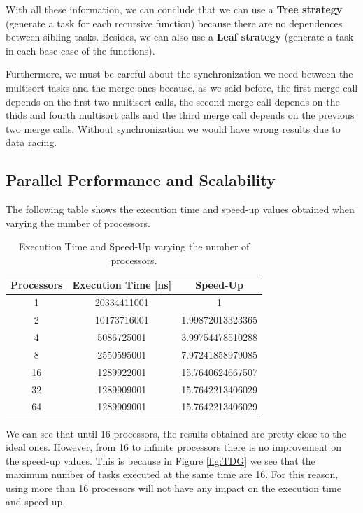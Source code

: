 \documentclass[12pt, a4paper]{article}
\begin{document}
With all these information, we can conclude that we can use a \textbf{Tree strategy} (generate a task for each recursive function) because there are no dependences between sibling tasks. Besides, we can also use a \textbf{Leaf strategy} (generate a task in each base case of the functions).

Furthermore, we must be careful about the synchronization we need between the multisort tasks and the merge ones because, as we said before, the first merge call depends on the first two multisort calls, the second merge call depends on the thids and fourth multisort calls and the third merge call depends on the previous two merge calls. Without synchronization we would have wrong results due to data racing.

\subsection{Parallel Performance and Scalability}

The following table shows the execution time and speed-up values obtained when varying the number of processors.

\begin{table}[H]
\centering
\begin{tabular}{ |c|c|c| } 
 \hline
 \textbf{Processors} & \textbf{Execution Time [ns]} & \textbf{Speed-Up} \\ 
 \hline
 \hline
	1	& 20334411001	& 1 \\
	 \hline
	2	& 10173716001	& 1.99872013323365 \\
	 \hline
	4	& 5086725001	& 3.99754478510288 \\
	 \hline
	8	& 2550595001	& 7.97241858979085 \\
	 \hline
	16	& 1289922001	& 15.7640624667507 \\
	 \hline
	32	& 1289909001	& 15.7642213406029 \\
	 \hline
	64	& 1289909001	& 15.7642213406029 \\
 \hline
\end{tabular}
 
 \label{tab:Scalability_S1}
\caption{Execution Time and Speed-Up varying the number of processors.}
\end{table}

We can see that until 16 processors, the results obtained are pretty close to the ideal ones. However, from 16 to infinite processors there is no improvement on the speed-up values. This is because in Figure \ref{fig:TDG} we see that the maximum number of tasks executed at the same time are 16. For this reason, using more than 16 processors will not have any impact on the execution time and speed-up.
\end{document}
